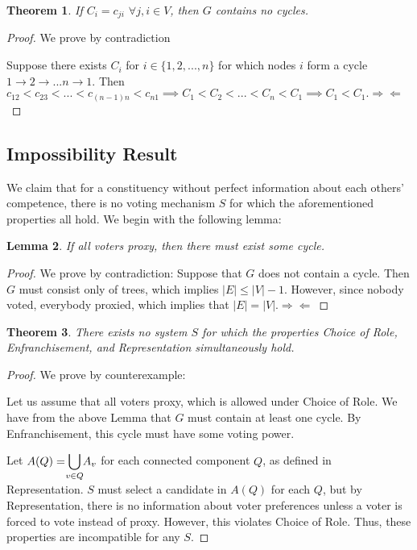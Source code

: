 \documentclass[10pt]{article}
\newtheorem{theorem}{Theorem}[section]
\newtheorem{lemma}[theorem]{Lemma}
\theoremstyle{definition}
\begin{document}
\begin{theorem}

If $C_i = c_{ji}$ $\forall j, i \in V$, then $G$ contains no cycles.

\end{theorem}

\begin{proof}

We prove by contradiction

Suppose there exists $C_i$ for $i \in \{1, 2, ..., n\}$ for which nodes $i$ form a cycle $1 \rightarrow 2 \rightarrow ... n \rightarrow 1$. Then $c_{12} < c_{23 }< ... < c_{(n-1)n} < c_{n1} \implies C_1 < C_2 < ... < C_n < C_1 \implies C_1 < C_1. \Rightarrow\Leftarrow$
\end{proof}


\subsection{Impossibility Result}
We claim that for a constituency without perfect information about each others' competence, there is no voting mechanism $S$ for which the aforementioned properties all hold. We begin with the following lemma:

\begin{lemma}
If all voters proxy, then there must exist some cycle.
\end{lemma}
\begin{proof}
We prove by contradiction:
Suppose that $G$ does not contain a cycle. Then $G$ must consist only of trees, which implies $|E| \leq |V| -1$. However, since nobody voted, everybody proxied, which implies that $|E| = |V|. \Rightarrow\Leftarrow$
\end{proof}

\begin{theorem} 
There exists no system $S$ for which the properties Choice of Role, Enfranchisement, and Representation simultaneously hold.
\end{theorem}
\begin{proof} We prove by counterexample:

Let us assume that all voters proxy, which is allowed under Choice of Role. We have from the above Lemma that $G$ must contain at least one cycle. By Enfranchisement, this cycle must have some voting power.

Let $A(Q) = \smashoperator{\bigcup\limits_{v \in Q}}A_v$ for each connected component $Q$, as defined in Representation. $S$ must select a candidate in $A(Q)$ for each $Q$, but by Representation, there is no information about voter preferences unless a voter is forced to vote instead of proxy. However, this violates Choice of Role. Thus, these properties are incompatible for any $S$.

\end{proof}
\end{document}
